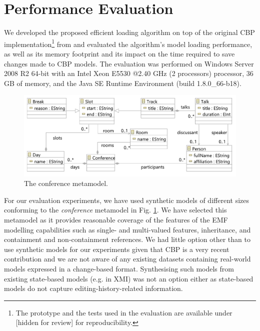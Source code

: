 \documentclass{llncs}
\begin{document}


\section{Performance Evaluation}
\label{sec:performance_evaluation}
We developed the proposed efficient loading algorithm on top of the original CBP implementation\footnote{The prototype and the tests used in the evaluation are available under [hidden for review] for reproducibility. %
} from \cite{yohannis2017turning} and evaluated the algorithm's model loading performance, as well as its memory footprint and its impact on the time required to save changes made to CBP models. The evaluation was performed on Windows Server 2008 R2 64-bit with an Intel Xeon E5530 @2.40 GHz (2 processors) processor, 36 GB of memory, and the Java SE Runtime Environment (build 1.8.0\_66-b18).

\begin{figure}[htbp]
    \centering
    \includegraphics[width=0.9\linewidth]{conference_metamodel}
    \caption{The conference metamodel.}   
    \label{fig:node_metamodel}
\end{figure}

For our evaluation experiments, we have used synthetic models of different sizes conforming to the \emph{conference} metamodel in Fig. \ref{fig:node_metamodel}. We have selected this metamodel as it provides reasonable coverage of the features of the EMF modelling capabilities such as single- and multi-valued features, inheritance, and containment and non-containment references. We had little option other than to use synthetic models for our experiments given that CBP is a very recent contribution and we are not aware of any existing datasets containing real-world models expressed in a change-based format. Synthesising such models from existing state-based models (e.g. in XMI) was not an option either as state-based models do not capture editing-history-related information.    
\end{document}
